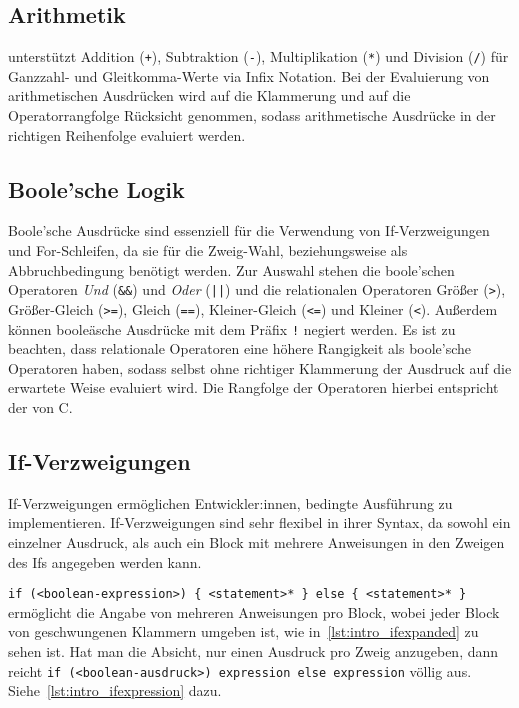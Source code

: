 \subsection{Arithmetik}

\Toya unterstützt Addition (\texttt{+}), Subtraktion (\texttt{-}), Multiplikation (\texttt{*}) und Division (\texttt{/}) für Ganzzahl- und Gleitkomma-Werte via Infix Notation. Bei der Evaluierung von arithmetischen Ausdrücken wird auf die Klammerung und auf die Operatorrangfolge Rücksicht genommen, sodass arithmetische Ausdrücke in der richtigen Reihenfolge evaluiert werden. 


\subsection{Boole'sche Logik}

Boole'sche Ausdrücke sind essenziell für die Verwendung von If-Verzweigungen und For-Schleifen, da sie für die Zweig-Wahl, beziehungsweise als Abbruchbedingung benötigt werden. Zur Auswahl stehen die boole'schen Operatoren \textit{Und} (\texttt{\&\&}) und \textit{Oder} (\texttt{||}) und die relationalen Operatoren Größer (\texttt{>}), Größer-Gleich (\texttt{>=}), Gleich (\texttt{==}), Kleiner-Gleich (\texttt{<=}) und Kleiner (\texttt{<}). Außerdem können booleäsche Ausdrücke mit dem Präfix \texttt{!} negiert werden. Es ist zu beachten, dass relationale Operatoren eine höhere Rangigkeit als boole'sche Operatoren haben, sodass selbst ohne richtiger Klammerung der Ausdruck auf die erwartete Weise evaluiert wird. Die Rangfolge der Operatoren hierbei entspricht der von C.


\subsection{If-Verzweigungen}

If-Verzweigungen ermöglichen Entwickler:innen, bedingte Ausführung zu implementieren. If-Verzweigungen sind sehr flexibel in ihrer Syntax, da sowohl ein einzelner Ausdruck, als auch ein Block mit mehrere Anweisungen in den Zweigen des Ifs angegeben werden kann. 

\texttt{if (<boolean-expression>) \{ <statement>* \} else \{ <statement>* \}} ermöglicht die Angabe von mehreren Anweisungen pro Block, wobei jeder Block von geschwungenen Klammern umgeben ist, wie in~\autoref{lst:intro_ifexpanded} zu sehen ist. Hat man die Absicht, nur einen Ausdruck pro Zweig anzugeben, dann reicht \texttt{if (<boolean-ausdruck>) expression else expression} völlig aus. Siehe~\autoref{lst:intro_ifexpression} dazu.

